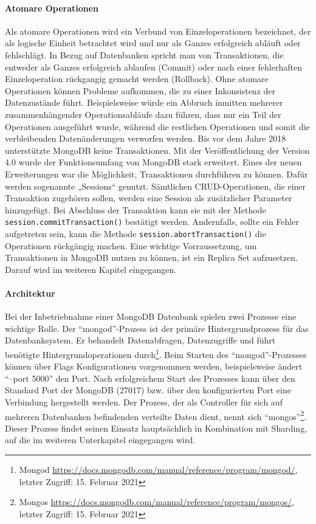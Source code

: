 \paragraph{Atomare Operationen}
Als atomare Operationen wird ein Verbund von Einzeloperationen bezeichnet, der als logische Einheit betrachtet wird und nur als Ganzes erfolgreich abläuft oder fehlschlägt. In Bezug auf Datenbanken spricht man von Transaktionen, die entweder als Ganzes erfolgreich ablaufen (Commit) oder nach einer fehlerhaften Einzeloperation rückgangig gemacht werden (Rollback). Ohne atomare Operationen können Probleme aufkommen, die zu einer Inkonsistenz der Datenzustände führt. Beispielsweise würde ein Abbruch inmitten mehrerer zusammenhängender Operationsabläufe dazu führen,  dass nur ein Teil der Operationen ausgeführt wurde, während die restlichen Operationen und somit die verbleibenden Datenänderungen verworfen werden.
\newline
Bis vor dem Jahre 2018 unterstützte MongoDB keine Transaktionen. Mit der Veröffentlichung der Version 4.0 wurde der Funktionsumfang von MongoDB stark erweitert. Eines der neuen Erweiterungen war die Möglichkeit, Transaktionen durchführen zu können. Dafür werden sogenannte „Sessions“ genutzt. Sämtlichen CRUD-Operationen, die einer Transaktion zugehören sollen, werden eine Session als zusätzlicher Parameter hinzugefügt.  Bei Abschluss der Transaktion kann sie mit der Methode \texttt{session.commitTransaction()} bestätigt werden. Andernfalls, sollte ein Fehler aufgetreten sein, kann die Methode \texttt{session.abortTransaction()} die Operationen rückgängig machen. Eine wichtige Vorraussetzung, um Transaktionen in MongoDB nutzen zu können, ist ein Replica Set aufzusetzen. Darauf wird im weiteren Kapitel eingegangen.
\newline


\paragraph{Architektur}
Bei der Inbetriebnahme einer MongoDB Datenbank spielen zwei Prozesse eine wichtige  Rolle. \newline Der  \enquote{mongod}-Prozess ist der primäre Hintergrundprozess für das Datenbanksystem. Er behandelt Datenabfragen, Datenzugriffe und führt benötigte Hintergrundoperationen durch\footnote{Mongod \url{https://docs.mongodb.com/manual/reference/program/mongod/}, letzter Zugriff: 15. Februar 2021}. Beim Starten des \enquote{mongod}-Prozesses können über Flags Konfigurationen vorgenommen werden, beispielsweise ändert \enquote{--port 5000} den Port. Nach erfolgreichem Start des Prozesses kann über den Standard Port der MongoDB (27017) bzw. über den konfigurierten Port eine Verbindung hergestellt werden.\newline
Der Prozess, der als Controller für sich auf mehreren Datenbanken befindenden verteilte Daten dient, nennt sich \enquote{mongos}\footnote{Mongos \url{https://docs.mongodb.com/manual/reference/program/mongos/}, letzter Zugriff: 15. Februar 2021}. Dieser Prozess findet seinen Einsatz hauptsächlich in Kombination mit Sharding, auf die im weiteren Unterkapitel eingegangen wird. \newline

